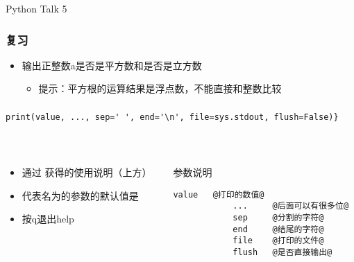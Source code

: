 



\PreFirstFrame
\begin{frame} [fragile]
	\centerline{\fontsize{42}{42}\selectfont Python Talk 5}
\end{frame}
\PostFirstFrame

\begin{frame} [fragile]
	\frametitle{复习}
	\linespread{1.5}
	\begin{itemize}
	\item 输出正整数a是否是平方数和是否是立方数
		\begin{itemize}
		\item 提示：平方根的运算结果是浮点数，不能直接和整数比较
		\end{itemize}
	\end{itemize}
\end{frame}

\begin{frame} [fragile]
	\frametitle{}
	\linespread{1.25}
	\begin{lstlisting}[style=pythonstyle, gobble=4]
	print(value, ..., sep=' ', end='\n', file=sys.stdout, flush=False)}
	\end{lstlisting}
	\
	\begin{columns}[T]
		\begin{column}[T]{.5\textwidth}
			\begin{itemize}
			\item 通过
				获得的使用说明（上方）
			\item {}
				代表名为的参数的默认值是
			\item 按q退出help
			\end{itemize}
		\end{column}
		\begin{column}[T]{.5\textwidth}
			参数说明
			\begin{lstlisting}[style=pythonstyle, gobble=12, escapechar=@]
			value	@打印的数值@
			...		@后面可以有很多位@
			sep		@分割的字符@
			end		@结尾的字符@
			file	@打印的文件@
			flush	@是否直接输出@
			\end{lstlisting}
		\end{column}
	\end{columns}
\end{frame}

